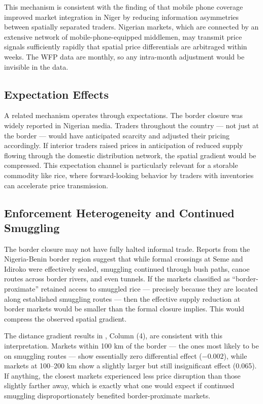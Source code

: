 \documentclass[12pt]{article}
\begin{document}
This mechanism is consistent with the finding of \citet{aker2010information} that mobile phone coverage improved market integration in Niger by reducing information asymmetries between spatially separated traders. Nigerian markets, which are connected by an extensive network of mobile-phone-equipped middlemen, may transmit price signals sufficiently rapidly that spatial price differentials are arbitraged within weeks. The WFP data are monthly, so any intra-month adjustment would be invisible in the data.

\subsection{Expectation Effects}

A related mechanism operates through expectations. The border closure was widely reported in Nigerian media. Traders throughout the country --- not just at the border --- would have anticipated scarcity and adjusted their pricing accordingly. If interior traders raised prices in anticipation of reduced supply flowing through the domestic distribution network, the spatial gradient would be compressed. This expectation channel is particularly relevant for a storable commodity like rice, where forward-looking behavior by traders with inventories can accelerate price transmission.

\subsection{Enforcement Heterogeneity and Continued Smuggling}

The border closure may not have fully halted informal trade. Reports from the Nigeria-Benin border region suggest that while formal crossings at Seme and Idiroko were effectively sealed, smuggling continued through bush paths, canoe routes across border rivers, and even tunnels. If the markets classified as ``border-proximate'' retained access to smuggled rice --- precisely because they are located along established smuggling routes --- then the effective supply reduction at border markets would be smaller than the formal closure implies. This would compress the observed spatial gradient.

The distance gradient results in , Column (4), are consistent with this interpretation. Markets within 100 km of the border --- the ones most likely to be on smuggling routes --- show essentially zero differential effect ($-0.002$), while markets at 100--200 km show a slightly larger but still insignificant effect (0.065). If anything, the closest markets experienced less price disruption than those slightly farther away, which is exactly what one would expect if continued smuggling disproportionately benefited border-proximate markets.
\end{document}
